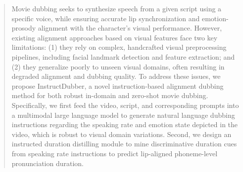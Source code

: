 \begin{abstract}
Movie dubbing seeks to synthesize speech from a given script using a specific voice, while ensuring accurate lip synchronization and emotion-prosody alignment with the character’s visual performance. 
However, existing alignment approaches based on visual features face two key limitations: 
(1) they rely on complex, handcrafted visual preprocessing pipelines, including facial landmark detection and feature extraction; and (2) they generalize poorly to unseen visual domains, often resulting in degraded alignment and dubbing quality.
To address these issues, we propose InstructDubber, a novel instruction-based alignment dubbing method for both robust in-domain and zero-shot movie dubbing.
Specifically, we first feed the video, script, and corresponding prompts into a multimodal large language model to generate natural language dubbing instructions regarding the speaking rate and emotion state depicted in the video, which is robust to visual domain variations.
Second, we design an instructed duration distilling module to mine discriminative duration cues from speaking rate instructions to predict lip-aligned phoneme-level pronunciation duration.

\end{abstract}
